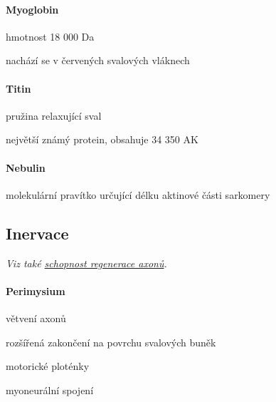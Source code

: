 \documentclass[DIV=8]{scrreprt}
\begin{document}
\paragraph{Myoglobin}
\begin{myItemize}[nosep]
    \item hmotnost 18 000 Da
    \item nachází se v červených svalových vláknech
\end{myItemize}



\paragraph{Titin}
\begin{myItemize}[nosep]
    \item pružina relaxující sval
    \item největší známý protein, obsahuje 34 350 AK
\end{myItemize}



\paragraph{Nebulin}
\begin{myItemize}[nosep]
    \item molekulární pravítko určující délku aktinové části sarkomery
\end{myItemize}



\subsection{Inervace} \label{Inervace}


\emph{Viz také \hyperref[Schop­nost re­gen­er­ace]{schopnost regenerace axonů}.}

\paragraph{Perimysium}
\begin{myEnumerate}[nosep]
    \item větvení axonů
    \item rozšířená zakončení na povrchu svalových buněk
    \item motorické ploténky
    \item myoneurální spojení
\end{myEnumerate}
\end{document}
